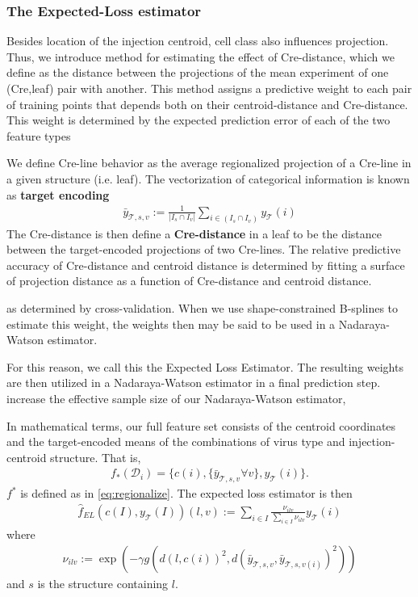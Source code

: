 \newpage
\subsubsection{The Expected-Loss estimator}

\label{supp_sec:el}

Besides location of the injection centroid, cell class also influences projection.
Thus, we introduce method for estimating the effect of Cre-distance, which we define as the distance between the projections of the mean experiment of one (Cre,leaf) pair with another.
This method assigns a predictive weight to each pair of training points that depends both on their centroid-distance and Cre-distance.
This weight is determined by the expected prediction error of each of the two feature types

We define Cre-line behavior as the average regionalized projection of a Cre-line in a given structure (i.e. leaf).
The vectorization of categorical information is known as \textbf{target encoding} 
\begin{eqnarray*}
\bar y_{\mathcal T,s,v} := \frac{1}{|I_s \cap I_v|}  \sum_{i \in (I_s \cap I_v)} y_{\mathcal T}(i)
\end{eqnarray*}
The Cre-distance is then define a \textbf{Cre-distance} in a leaf to be the distance between the target-encoded projections of two Cre-lines.
The relative predictive accuracy of Cre-distance and centroid distance is determined by fitting a surface of projection distance as a function of Cre-distance and centroid distance. 

 as determined by cross-validation.
When we use shape-constrained B-splines to estimate this weight, the weights then may be said to be used in a Nadaraya-Watson estimator.


For this reason, we call this the Expected Loss Estimator.
The resulting weights are then utilized in a Nadaraya-Watson estimator in a final prediction step.
increase the effective sample size of our Nadaraya-Watson estimator,

In mathematical terms, our full feature set consists of the centroid coordinates and the target-encoded means of the combinations of virus type and injection-centroid structure.
That is, 
\begin{eqnarray*}
f_*({\mathcal D}_i) = \{c(i) , \{\bar y_{\mathcal T,s,v}  \forall v \}, y_{\mathcal T}(i) \}.
\end{eqnarray*}
$f^*$ is defined as in \eqref{eq:regionalize}.
The expected loss estimator is then 
\begin{eqnarray*}
\hat f_{EL} ( c(I),y_{\mathcal T} (I))(l,v) :=  \sum_{i \in I} \frac{ \nu_{ilv} }{\sum_{i \in I}  \nu_{ilv}  } y_{\mathcal T}(i)
\end{eqnarray*}
where
\begin{eqnarray*}
\nu_{ilv} := \exp (- \gamma g( d(l, c(i))^2, d(\bar y_{\mathcal T,s,v} , \bar y_{\mathcal T,s,v(i)}  )^2))
\end{eqnarray*}
and $s$ is the structure containing $l$.

